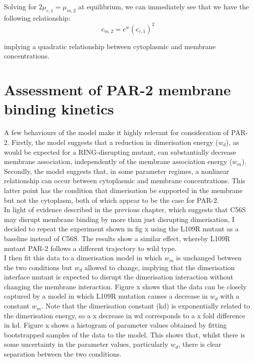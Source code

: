 \documentclass[12pt]{"report"}
\begin{document}
\begin{center}
\end{center}

Solving for $2\mu_{c,1} = \mu_{m,2}$ at equilibrium, we can immediately see that we have the following relationship:
\begin{equation}
c_{m,2} = e^{w} (c_{c,1})^2
\end{equation}

implying a quadratic relationship between cytoplasmic and membrane concentrations.\\


\clearpage
\section{Assessment of PAR-2 membrane binding kinetics}


A few behaviours of the model make it highly relevant for consideration of PAR-2. Firstly, the model suggests that a reduction in dimerisation energy ($w_d$), as would be expected for a RING-disrupting mutant, can substantially decrease membrane association, independently of the membrane association energy ($w_m$). Secondly, the model suggests that, in some parameter regimes, a nonlinear relationship can occur between cytoplasmic and membrane concentrations. This latter point has the condition that dimerisation be supported in the membrane but not the cytoplasm, both of which appear to be the case for PAR-2.\\


In light of evidence described in the previous chapter, which suggests that C56S may disrupt membrane binding by more than just disrupting dimerisation, I decided to repeat the experiment shown in fig x using the L109R mutant as a baseline instead of C56S. The results show a similar effect, whereby L109R mutant PAR-2 follows a different trajectory to wild type.\\

I then fit this data to a dimerisation model in which $w_m$ is unchanged between the two conditions but $w_d$ allowed to change, implying that the dimerisation interface mutant is expected to disrupt the dimerisation interaction without changing the membrane interaction. Figure x shows that the data can be closely captured by a model in which L109R mutation causes a decrease in $w_d$ with a constant $w_m$. Note that the dimerisation constant (kd) is exponentially related to the dimerisation energy, so a x decrease in wd corresponds to a x fold difference in kd. Figure x shows a histogram of parameter values obtained by fitting bootstrapped samples of the data to the model. This shows that, whilst there is some uncertainty in the parameter values, particularly $w_d$, there is clear separation between the two conditions.\\
\end{document}
